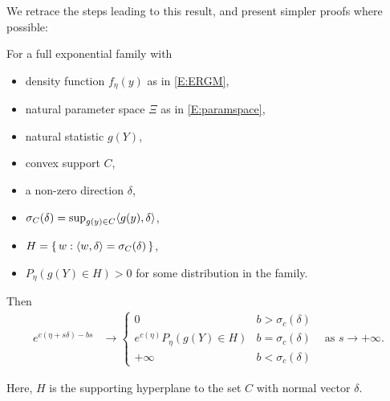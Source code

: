 We retrace the steps leading to this result, and present simpler proofs where possible:
\begin{theorem}\label{Thm:e_c}
For a full exponential family with
\begin{itemize}
\item density function $f_\eta(y)$ as in \eqref{E:ERGM},
\item natural parameter space $\Xi$ as in \eqref{E:paramspace},
\item natural statistic $g(Y)$,
\item convex support $C$,
\item  a non-zero direction $\delta$,
\item $\sigma_C (\delta) = \sup_{g(y) \in C} \langle  g(y), \delta \rangle$,
\item $H = \{\, w: \langle w, \delta \rangle = \sigma_C(\delta)  \,\}$,
\item $P_\eta(g(Y) \in H ) > 0$ for some distribution in the family.
\end{itemize}
Then
\begin{align*}
e^{c(\eta + s \delta) - bs} &\to 
		\begin{cases} 
			0 									& b > \sigma_c(\delta) \\
			e^{c(\eta)} P_\eta(g(Y) \in H ) 		& b = \sigma_c(\delta) \\
			+\infty								& b < \sigma_c(\delta)
		\end{cases}
& \text{as } s \to +\infty.
\end{align*}

\end{theorem}
Here, $H$ is the supporting hyperplane to the set $C$ with normal vector $\delta$.

